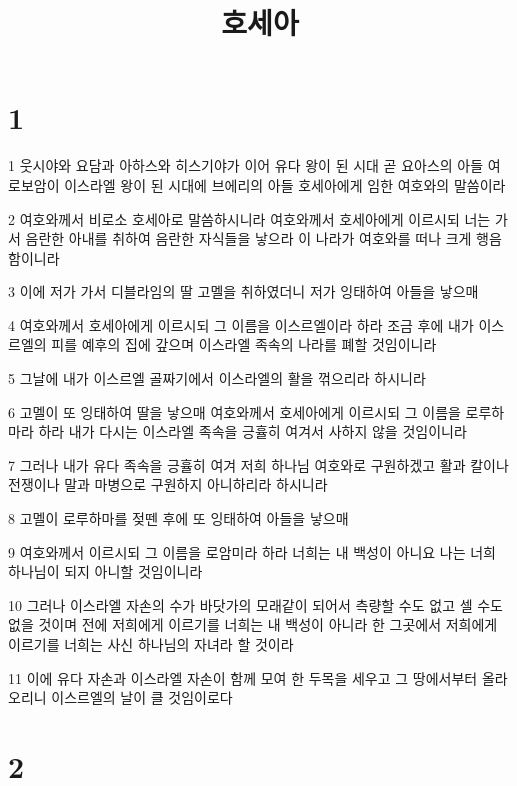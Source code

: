 

\title{호세아}


\chapter{1}

\par 1 웃시야와 요담과 아하스와 히스기야가 이어 유다 왕이 된 시대 곧 요아스의 아들 여로보암이 이스라엘 왕이 된 시대에 브에리의 아들 호세아에게 임한 여호와의 말씀이라
\par 2 여호와께서 비로소 호세아로 말씀하시니라 여호와께서 호세아에게 이르시되 너는 가서 음란한 아내를 취하여 음란한 자식들을 낳으라 이 나라가 여호와를 떠나 크게 행음함이니라
\par 3 이에 저가 가서 디블라임의 딸 고멜을 취하였더니 저가 잉태하여 아들을 낳으매
\par 4 여호와께서 호세아에게 이르시되 그 이름을 이스르엘이라 하라 조금 후에 내가 이스르엘의 피를 예후의 집에 갚으며 이스라엘 족속의 나라를 폐할 것임이니라
\par 5 그날에 내가 이스르엘 골짜기에서 이스라엘의 활을 꺾으리라 하시니라
\par 6 고멜이 또 잉태하여 딸을 낳으매 여호와께서 호세아에게 이르시되 그 이름을 로루하마라 하라 내가 다시는 이스라엘 족속을 긍휼히 여겨서 사하지 않을 것임이니라
\par 7 그러나 내가 유다 족속을 긍휼히 여겨 저희 하나님 여호와로 구원하겠고 활과 칼이나 전쟁이나 말과 마병으로 구원하지 아니하리라 하시니라
\par 8 고멜이 로루하마를 젖뗀 후에 또 잉태하여 아들을 낳으매
\par 9 여호와께서 이르시되 그 이름을 로암미라 하라 너희는 내 백성이 아니요 나는 너희 하나님이 되지 아니할 것임이니라
\par 10 그러나 이스라엘 자손의 수가 바닷가의 모래같이 되어서 측량할 수도 없고 셀 수도 없을 것이며 전에 저희에게 이르기를 너희는 내 백성이 아니라 한 그곳에서 저희에게 이르기를 너희는 사신 하나님의 자녀라 할 것이라
\par 11 이에 유다 자손과 이스라엘 자손이 함께 모여 한 두목을 세우고 그 땅에서부터 올라 오리니 이스르엘의 날이 클 것임이로다

\chapter{2}

